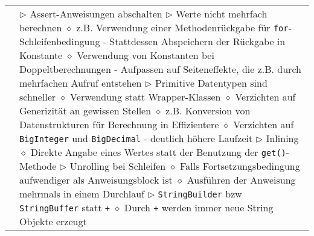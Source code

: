 \begin{longtable}{ | p{} p{} | }
	\makecell[l]{Laufzeitverbesserungen} & \makecell[l]{
	$\triangleright$ Assert-Anweisungen abschalten \\
	$\triangleright$ Werte nicht mehrfach berechnen \\
	\hspace{0.4cm} $\diamond$ z.B. Verwendung einer Methodenrückgabe für \texttt{for}-Schleifenbedingung \\
	\hspace{0.6cm} - Stattdessen Abspeichern der Rückgabe in Konstante \\
	\hspace{0.4cm} $\diamond$ Verwendung von Konstanten bei Doppeltberechnungen \\
	\hspace{0.6cm} - Aufpassen auf Seiteneffekte, die z.B. durch mehrfachen Aufruf entstehen \\
	$\triangleright$ Primitive Datentypen sind schneller \\
	\hspace{0.4cm} $\diamond$ Verwendung statt Wrapper-Klassen \\
	\hspace{0.4cm} $\diamond$ Verzichten auf Generizität an gewissen Stellen \\
	\hspace{0.4cm} $\diamond$ z.B. Konversion von Datenstrukturen für Berechnung in Effizientere  \\
	\hspace{0.4cm} $\diamond$ Verzichten auf \texttt{BigInteger} und \texttt{BigDecimal} \\
	\hspace{0.6cm} - deutlich höhere Laufzeit \\
	$\triangleright$ Inlining \\
	\hspace{0.4cm} $\diamond$ Direkte Angabe eines Wertes statt der Benutzung der \texttt{get()}-Methode \\
	$\triangleright$ Unrolling bei Schleifen \\
	\hspace{0.4cm} $\diamond$ Falls Fortsetzungsbedingung aufwendiger als Anweisungsblock ist \\
	\hspace{0.4cm} $\diamond$ Ausführen der Anweisung mehrmals in einem Durchlauf \\
	$\triangleright$ \texttt{StringBuilder} bzw \texttt{StringBuffer} statt \texttt{+} \\
	\hspace{0.4cm} $\diamond$ Durch \texttt{+} werden immer neue String Objekte erzeugt \\
}
\end{longtable}
